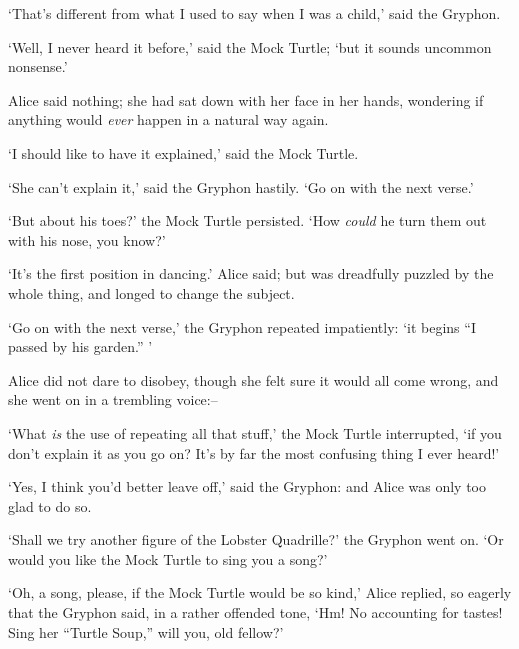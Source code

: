   `That's different from what I used to say when I was a child,'
said the Gryphon.

  `Well, I never heard it before,' said the Mock Turtle; `but it
sounds uncommon nonsense.'

  Alice said nothing; she had sat down with her face in her
hands, wondering if anything would {\it ever} happen in a natural way
again.

  `I should like to have it explained,' said the Mock Turtle.

  `She can't explain it,' said the Gryphon hastily.  `Go on with
the next verse.'

  `But about his toes?' the Mock Turtle persisted.  `How {\it could}
he turn them out with his nose, you know?'

  `It's the first position in dancing.' Alice said; but was
dreadfully puzzled by the whole thing, and longed to change the
subject.

  `Go on with the next verse,' the Gryphon repeated impatiently:
`it begins ``I passed by his garden.'' '

  Alice did not dare to disobey, though she felt sure it would
all come wrong, and she went on in a trembling voice:--

\onelineskip
{}
\onelineskip
\startline{0.6}{    [later editions continued as follows:}
\startline{0.6}{    And concluded the banquet--]}
\onelineskip

  `What {\it is} the use of repeating all that stuff,' the Mock Turtle
interrupted, `if you don't explain it as you go on?  It's by far
the most confusing thing I ever heard!'

  `Yes, I think you'd better leave off,' said the Gryphon:  and
Alice was only too glad to do so.

  `Shall we try another figure of the Lobster Quadrille?' the
Gryphon went on.  `Or would you like the Mock Turtle to sing you
a song?'

  `Oh, a song, please, if the Mock Turtle would be so kind,'
Alice replied, so eagerly that the Gryphon said, in a rather
offended tone, `Hm!  No accounting for tastes!  Sing her
``Turtle Soup,'' will you, old fellow?'

